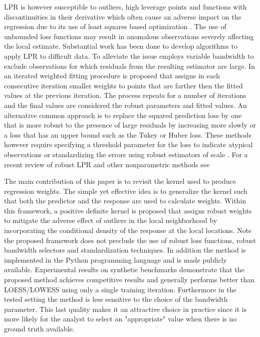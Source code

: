\documentclass[preprint,1p,times]{elsarticle}
\begin{document}
LPR is however susceptible to outliers, high leverage points and functions with discontinuities in their derivative which often cause an adverse impact on the regression due to its use of least squares based optimization \citep{10.1002/wics.1492}. The use of unbounded loss functions may result in anomalous observations severely affecting the local estimate. Substantial work has been done to develop algorithms to apply LPR to difficult data. To alleviate the issue \citep{10.1214/aos/1024691246} employs variable bandwidth to exclude observations for which residuals from the resulting estimator are large. In \citep{clevland79} an iterated weighted fitting procedure is proposed that assigns in each consecutive iteration smaller weights to points that are farther then the fitted values at the previous iteration. The process repeats for a number of iterations and the final values are considered the robust parameters and fitted values. An alternative common approach is to replace the squared prediction loss by one that is more robust to the presence of large residuals by increasing more slowly or a loss that has an upper bound such as the Tukey or Huber loss. These methods however require specifying a threshold parameter for the loss to indicate atypical observations or standardizing the errors using robust estimators of scale \citep{Maronna2006RobustST}. For a recent review of robust LPR and other nonparametric methods see \citep{10.1002/wics.1492, SALIBIANBARRERA2023}

The main contribution of this paper is to revisit the kernel used to produce regression weights. The simple yet effective idea is to generalize the kernel such that both the predictor and the response are used to calculate weights. Within this framework, a positive definite kernel is proposed that assigns robust weights to mitigate the adverse effect of outliers in the local neighborhood by incorporating the conditional density of the response at the local locations. Note the proposed framework does not preclude the use of robust loss functions, robust bandwidth selectors and standardization techniques. In addition the method is implemented in the Python programming language and is made publicly available. Experimental results on synthetic benchmarks demonstrate that the proposed method achieves competitive results and generally performs better than LOESS/LOWESS using only a single training iteration. Furthermore in the tested setting the method is less sensitive to the choice of the bandwidth parameter. This last quality makes it an attractive choice in practice since it is more likely for the analyst to select an "appropriate" value when there is no ground truth available.
\end{document}

